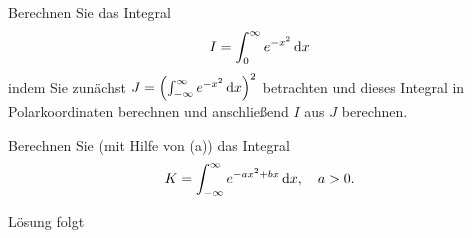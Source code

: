 \documentclass{atistandalonetask}
\begin{document}
  \begin{atiTask}[
    title = \textsc{Gauß}sche Integrale
  ]
    \begin{atiSubtasks}
    	\item Berechnen Sie das Integral
    	\[
    	I=\int_{0}^{\infty} e^{-x^2}\,\mathrm{d} x
    	\]
    	indem Sie zunächst $J=\left(\int_{-\infty}^{\infty} e^{-x^2}\,\mathrm{d} x\right)^2$ betrachten und dieses Integral in Polarkoordinaten berechnen und anschließend $I$ aus $J$ berechnen.
    	\item Berechnen Sie (mit Hilfe von (a)) das Integral
    	\[
    	K=\int_{-\infty}^{\infty} e^{-ax^2+bx}\,\mathrm{d} x,\quad a>0.
    	\]
    \end{atiSubtasks}	
  \end{atiTask}
  \begin{atiSolution}
  	Lösung folgt
%  
  \end{atiSolution}
\end{document}
